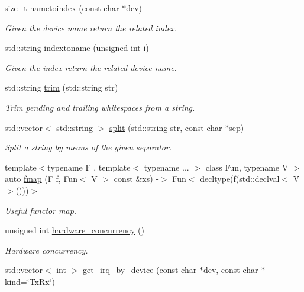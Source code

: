 \begin{DoxyCompactItemize}
size\+\_\+t \hyperlink{namespacepfq_aa68a4c07117073eeb820b32f955dda00}{nametoindex} (const char $\ast$dev)
\begin{DoxyCompactList}\small\item\em Given the device name return the related index. \end{DoxyCompactList}\item 
std\+::string \hyperlink{namespacepfq_a7bf753b90ae15e20c86f40ba59c87c36}{indextoname} (unsigned int i)
\begin{DoxyCompactList}\small\item\em Given the index return the related device name. \end{DoxyCompactList}\item 
std\+::string \hyperlink{namespacepfq_a02a1861a64cc518394d3cc4361799c9f}{trim} (std\+::string str)
\begin{DoxyCompactList}\small\item\em Trim pending and trailing whitespaces from a string. \end{DoxyCompactList}\item 
std\+::vector$<$ std\+::string $>$ \hyperlink{namespacepfq_a0c3aeb61dfd544cb08cb240202caf213}{split} (std\+::string str, const char $\ast$sep)
\begin{DoxyCompactList}\small\item\em Split a string by means of the given separator. \end{DoxyCompactList}\item 
{\footnotesize template$<$typename F , template$<$ typename ... $>$ class Fun, typename V $>$ }\\auto \hyperlink{namespacepfq_a75e00e20d4294c941fce79c9e884201a}{fmap} (F f, Fun$<$ V $>$ const \&xs) -\/$>$ Fun$<$ decltype(f(std\+::declval$<$ V $>$()))$>$
\begin{DoxyCompactList}\small\item\em Useful functor map. \end{DoxyCompactList}\item 
unsigned int \hyperlink{namespacepfq_a9a9e9be8b77976ed45483448f54de1f9}{hardware\+\_\+concurrency} ()
\begin{DoxyCompactList}\small\item\em Hardware concurrency. \end{DoxyCompactList}\item 
std\+::vector$<$ int $>$ \hyperlink{namespacepfq_ad3359e328bf6619dc4595eadb0d354ba}{get\+\_\+irq\+\_\+by\+\_\+device} (const char $\ast$dev, const char $\ast$kind=\char`\"{}Tx\+Rx\char`\"{})

\end{DoxyCompactItemize}
